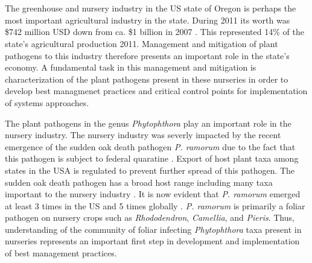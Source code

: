 \documentclass[12pt]{article}
\begin{document}

\section*{} %

\linenumbers

The greenhouse and nursery industry in the US state of Oregon is perhaps the most important agricultural industry in the state.  During 2011 its worth was \$742 million USD down from ca. \$1 billion in 2007 \cite{oda_2012}.  This represented 14\% of the state's agricultural production 2011.  Management and mitigation of plant pathogens to this industry therefore presents an important role in the state's economy.  A fundamental task in this management and mitigation is characterization of the plant pathogens present in these nurseries in order to develop best managmenet practices and critical control points for implementation of systems approaches\cite{parke_grunwald_2012}.

The plant pathogens in the genus \emph{Phytophthora} play an important role in the nursery industry. The nursery industry was severly impacted by the recent emergence of the sudden oak death pathogen \emph{P. ramorum} due to the fact that this pathogen is subject to federal quaratine \cite{werres_etal_2001,grunwald_etal_2008}.  Export of host plant taxa among states in the USA is regulated to prevent further spread of this pathogen.  The sudden oak death pathogen has a broad host range including many taxa important to the nursery industry \cite{tooley_etal_2004, hansen_etal_2005}.  It is now evident that \emph{P. ramorum} emerged at least 3 times in the US and 5 times globally \cite{grunwald_etal_2012,van_poucke_etal_2012}. \emph{P. ramorum} is primarily a foliar pathogen on nursery crops such as \emph{Rhododendron}, \emph{Camellia}, and \emph{Pieris}. Thus, understanding of the community of foliar infecting \emph{Phytophthora} taxa present in nurseries represents an important first step in development and implementation of best management practices.
\end{document}
